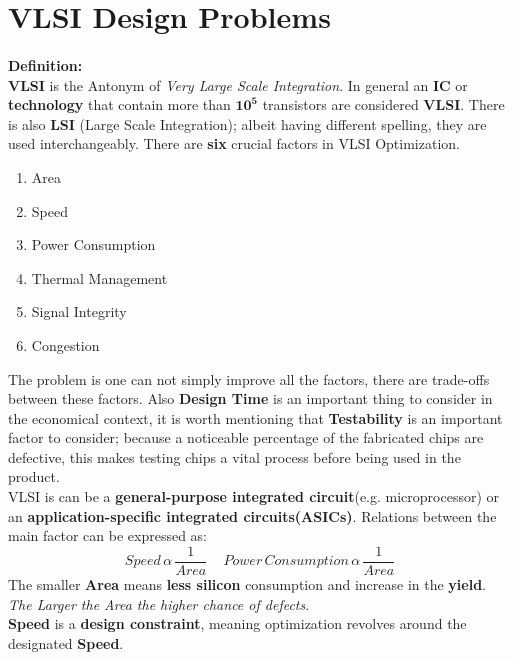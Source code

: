 \section{VLSI Design Problems}
\paragraph{}
\textbf{Definition:}\vspace{1em}\\
{\textbf{VLSI}} is the Antonym of \textit{Very Large Scale Integration}. In general an \textbf{IC} or \textbf{technology} that contain more than \(\mathbf{10^{5}}\) transistors are considered \textbf{VLSI}. There is also \textbf{LSI} (Large Scale Integration); albeit having different spelling, they are used interchangeably. There are \textbf{six} crucial factors in VLSI Optimization.\\
\begin{enumerate}
\item Area
\item Speed
\item Power Consumption 
\item Thermal Management
\item Signal Integrity
\item Congestion
\end{enumerate}

The problem is one can not simply improve all the factors, there are trade-offs between these factors. Also \textbf{Design Time} is an important thing to consider in the economical context, it is worth mentioning that\textbf{ Testability} is an important factor to consider; because a noticeable percentage of the fabricated chips are defective, this makes testing chips a vital process before being used in the product. \\ VLSI is can be a\textbf{ general-purpose integrated circuit}(e.g. microprocessor) or an \textbf{application-specific integrated circuits(ASICs)}.
Relations between the main factor can be expressed as:\[
	\mathit{Speed}\,\alpha\,\frac{1}{\mathit{Area}}\quad \,\mathit{Power\,Consumption}\,\alpha\,\frac{1}{\mathit{Area}} 
\]
The smaller \textbf{Area} means \textbf{less silicon }consumption and increase in the\textbf{ yield}. \textit{The Larger the Area the higher chance of defects}.\\
\textbf{Speed} is a\textbf{ design constraint}, meaning optimization revolves around the designated \textbf{Speed}. 